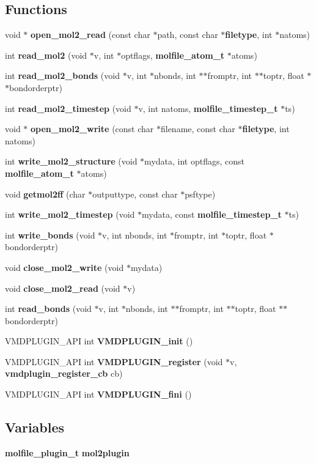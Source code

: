 \subsection*{Functions}
\begin{CompactItemize}
\item 
void $\ast$ {\bf open\_\-mol2\_\-read} (const char $\ast$path, const char $\ast${\bf filetype}, int $\ast$natoms)
\item 
int {\bf read\_\-mol2} (void $\ast$v, int $\ast$optflags, {\bf molfile\_\-atom\_\-t} $\ast$atoms)
\item 
int {\bf read\_\-mol2\_\-bonds} (void $\ast$v, int $\ast$nbonds, int $\ast$$\ast$fromptr, int $\ast$$\ast$toptr, float $\ast$$\ast$bondorderptr)
\item 
int {\bf read\_\-mol2\_\-timestep} (void $\ast$v, int natoms, {\bf molfile\_\-timestep\_\-t} $\ast$ts)
\item 
void $\ast$ {\bf open\_\-mol2\_\-write} (const char $\ast$filename, const char $\ast${\bf filetype}, int natoms)
\item 
int {\bf write\_\-mol2\_\-structure} (void $\ast$mydata, int optflags, const {\bf molfile\_\-atom\_\-t} $\ast$atoms)
\item 
void {\bf getmol2ff} (char $\ast$outputtype, const char $\ast$psftype)
\item 
int {\bf write\_\-mol2\_\-timestep} (void $\ast$mydata, const {\bf molfile\_\-timestep\_\-t} $\ast$ts)
\item 
int {\bf write\_\-bonds} (void $\ast$v, int nbonds, int $\ast$fromptr, int $\ast$toptr, float $\ast$bondorderptr)
\item 
void {\bf close\_\-mol2\_\-write} (void $\ast$mydata)
\item 
void {\bf close\_\-mol2\_\-read} (void $\ast$v)
\item 
int {\bf read\_\-bonds} (void $\ast$v, int $\ast$nbonds, int $\ast$$\ast$fromptr, int $\ast$$\ast$toptr, float $\ast$$\ast$bondorderptr)
\item 
VMDPLUGIN\_\-API int {\bf VMDPLUGIN\_\-init} ()
\item 
VMDPLUGIN\_\-API int {\bf VMDPLUGIN\_\-register} (void $\ast$v, {\bf vmdplugin\_\-register\_\-cb} cb)
\item 
VMDPLUGIN\_\-API int {\bf VMDPLUGIN\_\-fini} ()
\end{CompactItemize}
\subsection*{Variables}
\begin{CompactItemize}
\item 
{\bf molfile\_\-plugin\_\-t} {\bf mol2plugin}
\end{CompactItemize}


